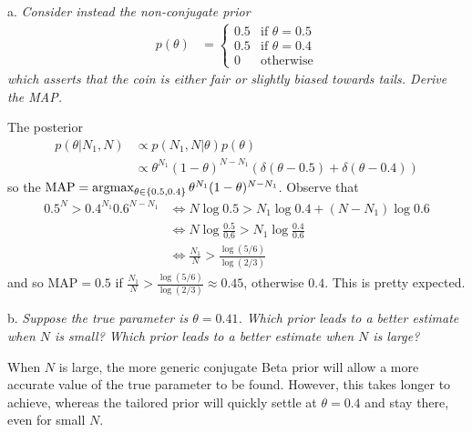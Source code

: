 a. \textit{Consider instead the non-conjugate prior}
\begin{align*}
p(\theta) &= \begin{cases}
0.5 &\text{if $\theta=0.5$}\\
0.5 &\text{if $\theta=0.4$}\\
0   &\text{otherwise}
\end{cases}
\end{align*}
\textit{which asserts that the coin is either fair or slightly biased towards tails. Derive the MAP.}

The posterior
\begin{align*}
p(\theta|N_1, N) &\propto p(N_1, N|\theta)p(\theta)\\
&\propto \theta^{N_1}(1-\theta)^{N-N_1} (\delta(\theta-0.5)+\delta(\theta-0.4))
\end{align*}
so the $\text{MAP} = \operatorname*{argmax}_{\theta\in\{0.5,0.4\}} \theta^{N_1}(1-\theta)^{N-N_1}$. Observe that
\begin{align*}
0.5^N > 0.4^{N_1}0.6^{N-N_1} &\iff N\log0.5 > N_1\log0.4 + (N-N_1)\log0.6\\
&\iff N\log\frac{0.5}{0.6} > N_1\log\frac{0.4}{0.6}\\
&\iff \frac{N_1}{N} > \frac{\log(5/6)}{\log(2/3)}
\end{align*}
and so $\mathrm{MAP} = 0.5$ if $\frac{N_1}{N} > \frac{\log(5/6)}{\log(2/3)} \approx 0.45$, otherwise $0.4$. This is pretty expected.

b. \textit{Suppose the true parameter is $\theta=0.41$. Which prior leads to a better estimate when $N$ is small? Which prior leads to a better estimate when $N$ is large?}

When $N$ is large, the more generic conjugate Beta prior will allow a more accurate value of the true parameter to be found. However, this takes longer to achieve, whereas the tailored prior will quickly settle at $\theta = 0.4$ and stay there, even for small $N$.


